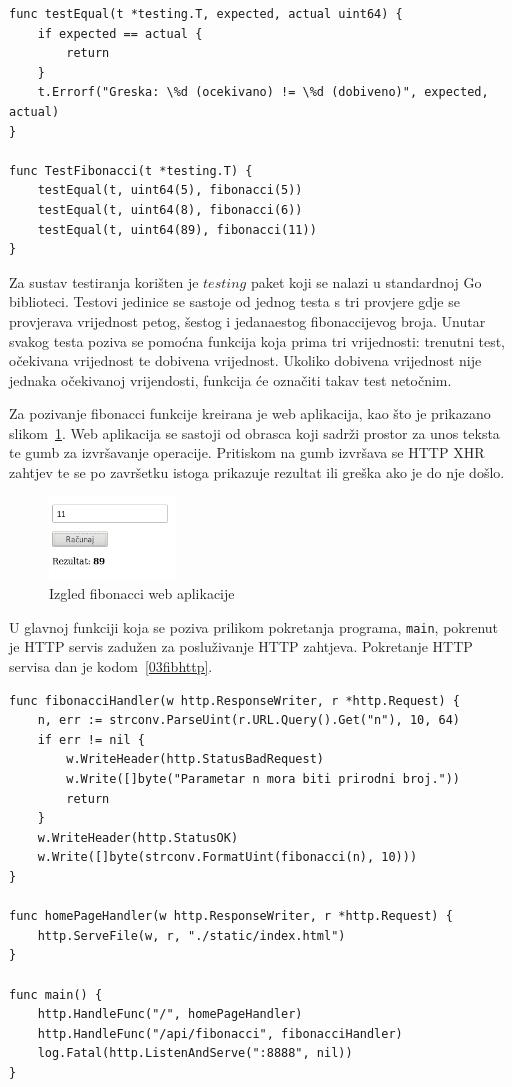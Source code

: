 \begin{lstlisting}[float=h]
func testEqual(t *testing.T, expected, actual uint64) {
	if expected == actual {
		return
	}
	t.Errorf("Greska: \%d (ocekivano) != \%d (dobiveno)", expected, actual)
}

func TestFibonacci(t *testing.T) {
	testEqual(t, uint64(5), fibonacci(5))
	testEqual(t, uint64(8), fibonacci(6))
	testEqual(t, uint64(89), fibonacci(11))
}

\end{lstlisting}

Za sustav testiranja korišten je $testing$ paket koji se nalazi u standardnoj Go biblioteci. Testovi
jedinice se sastoje od jednog testa s tri provjere gdje se provjerava vrijednost petog, šestog i
jedanaestog fibonaccijevog broja.  Unutar svakog testa poziva se pomoćna funkcija koja prima tri
vrijednosti: trenutni test, očekivana vrijednost te dobivena vrijednost. Ukoliko dobivena vrijednost
nije jednaka očekivanoj vrijendosti, funkcija će označiti takav test netočnim.

Za pozivanje fibonacci funkcije kreirana je web aplikacija, kao što je prikazano
slikom~\ref{fig:03fibv1png}. Web aplikacija se sastoji od obrasca koji sadrži prostor za unos teksta
te gumb za izvršavanje operacije. Pritiskom na gumb izvršava se HTTP XHR zahtjev te se po završetku
istoga prikazuje rezultat ili greška ako je do nje došlo.

\begin{figure}[h]
    \centering
    \includegraphics[width=0.3\textwidth]{img/03/fibonacci_html.png}
    \caption{Izgled fibonacci web aplikacije}%
    \label{fig:03fibv1png}
\end{figure}

U glavnoj funkciji koja se poziva prilikom pokretanja programa, \texttt{main}, pokrenut je HTTP
servis zadužen za posluživanje HTTP zahtjeva. Pokretanje HTTP servisa dan je kodom~\ref{03fibhttp}.

\begin{lstlisting}[float=h]
func fibonacciHandler(w http.ResponseWriter, r *http.Request) {
	n, err := strconv.ParseUint(r.URL.Query().Get("n"), 10, 64)
	if err != nil {
		w.WriteHeader(http.StatusBadRequest)
		w.Write([]byte("Parametar n mora biti prirodni broj."))
		return
	}
	w.WriteHeader(http.StatusOK)
	w.Write([]byte(strconv.FormatUint(fibonacci(n), 10)))
}

func homePageHandler(w http.ResponseWriter, r *http.Request) {
	http.ServeFile(w, r, "./static/index.html")
}

func main() {
	http.HandleFunc("/", homePageHandler)
	http.HandleFunc("/api/fibonacci", fibonacciHandler)
	log.Fatal(http.ListenAndServe(":8888", nil))
}
\end{lstlisting}

